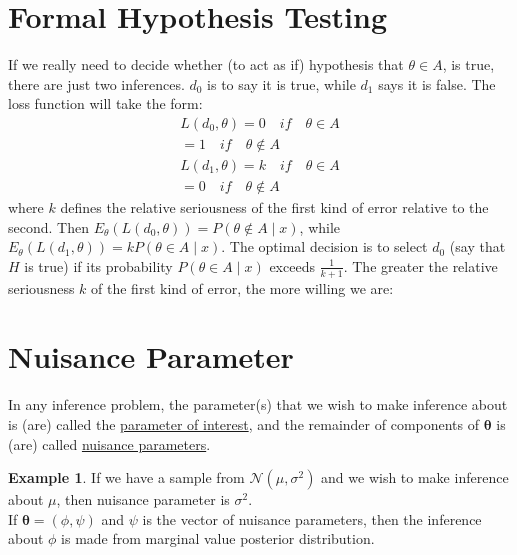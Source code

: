\documentclass[lecture,12pt,]{pcms-l}
\numberwithin{section}{chapter}
\numberwithin{equation}{chapter}
\theoremstyle{plain}
\theoremstyle{definition}
\newtheorem{example}{Example}[section]
\theoremstyle{definition}
\begin{document}
\section{Formal Hypothesis Testing}
If we really need to decide whether (to act as if) hypothesis that $\theta \in A$, is true, there are just two inferences. $d_0$ is to say it is true, while $d_1$ says it is false. The loss function will take the form:
\begin{equation}
\begin{split}
L(d_0, \theta)= 0 \quad if\quad \theta \in A
\\
= 1 \quad if \quad \theta \notin A 
\end{split}
\end{equation}
\begin{equation}
\begin{split}
L(d_1, \theta)= k \quad if\quad \theta \in A
\\
= 0 \quad if \quad \theta \notin A 
\end{split}
\end{equation}
where $k$ defines the relative seriousness of the first kind of error relative to the second. Then $E_{\theta}(L(d_0, \theta))=P(\theta \notin A \mid x)$, while  $E_{\theta}(L(d_1, \theta))= k P(\theta \in A \mid x)$. The optimal decision is to select $d_0$ (say that $H$ is true) if its probability $P(\theta \in A \mid x)$ exceeds $\frac{1}{k+1}$. The greater the relative seriousness $k$ of the first kind of error, the more willing we are: 

\section{Nuisance Parameter}
In any inference problem, the parameter(s) that we wish to make inference about is (are) called the \underline{parameter of interest}, and the remainder of components of $\mathbf{\theta}$ is (are) called \underline{nuisance parameters}.
\begin{example}
If we have a sample from $\mathcal{N}(\mu, \sigma^2)$ and we wish to make inference about $\mu$, then nuisance parameter is $\sigma^2$.
\\
If $\mathbf{\theta}=(\phi , \psi)$ and $\psi$ is the vector of nuisance parameters, then the inference about $\phi$ is made from marginal value posterior distribution.
\end{example}
\end{document}
